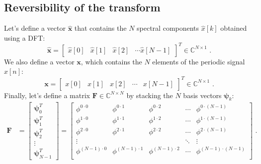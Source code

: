 \subsection{Reversibility of the transform}

Let's define a vector $\bm{\hat{x}}$ that contains the $N$ spectral
components $\hat{x}[k]$ obtained using a DFT:
\begin{equation}
  \bm{\hat{x}}=\begin{bmatrix}
    \hat{x}[0] & \hat{x}[1] & \hat{x}[2] & \cdots \hat{x}[N-1]
  \end{bmatrix}^T \in \mathbb{C}^{N\times 1} \,\,.
\end{equation}
We also define a vector  $\bm{x}$, which contains the $N$ elements of the periodic signal $x[n]$:
\begin{equation}
  \bm{x}=\begin{bmatrix}
    x[0] & x[1] & x[2] & \cdots & x[N-1]
  \end{bmatrix}^T \in \mathbb{C}^{N\times 1} \,\,.
\end{equation}
Finally, let's define a matrix $\bm{F}\in\mathbb{C}^{N\times N}$ by
stacking the $N$ basis vectors $\bm{\psi}_k$:
\begin{align*}
  \bm{F} & = \begin{bmatrix}
               \bm{\psi}_0^T \\
               \bm{\psi}_1^T \\
               \bm{\psi}_2^T \\
               \vdots        \\
               \bm{\psi}_{N-1}^T
             \end{bmatrix} = \begin{bmatrix}
                               \phi^{0\cdot0}     & \phi^{0 \cdot 1}     & \phi^{0 \cdot 2}     & \cdots & \phi^{0 \cdot (N-1)}     \\
                               \phi^{1\cdot0}     & \phi^{1 \cdot 1}     & \phi^{1 \cdot 2}     & \cdots & \phi^{1 \cdot (N-1)}     \\
                               \phi^{2\cdot0}     & \phi^{2 \cdot 1}     & \phi^{2 \cdot 2}     & \cdots & \phi^{2 \cdot (N-1)}     \\
                               \vdots             &                      &                      & \ddots & \vdots                   \\
                               \phi^{(N-1)\cdot0} & \phi^{(N-1) \cdot 1} & \phi^{(N-1) \cdot 2} & \cdots & \phi^{(N-1) \cdot (N-1)} \\
                             \end{bmatrix} \,\,.
\end{align*}
